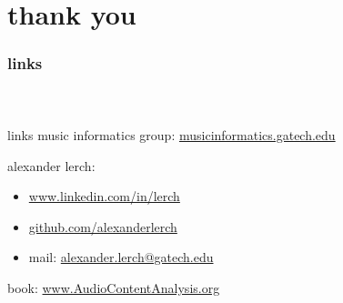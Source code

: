     \section[links]{thank you}

      \begin{frame}\frametitle{links}\framesubtitle{~}
            \begin{block}{links}
                music informatics group:
                \href{http://musicinformatics.gatech.edu}{musicinformatics.gatech.edu}

                \bigskip
                alexander lerch: 
                    \begin{itemize}
                        \item \href{https://www.linkedin.com/in/lerch}{www.linkedin.com/in/lerch}
                        \item \href{https://github.com/alexanderlerch}{github.com/alexanderlerch}
                        \item mail: \href{mailto:alexander.lerch@gatech.edu}{alexander.lerch@gatech.edu}
                    \end{itemize}             
                
                \bigskip                
                book: \href{https://www.AudioContentAnalysis.org}{www.AudioContentAnalysis.org}
                


								
								\vspace{5mm}

            \end{block}
            
        \end{frame}
